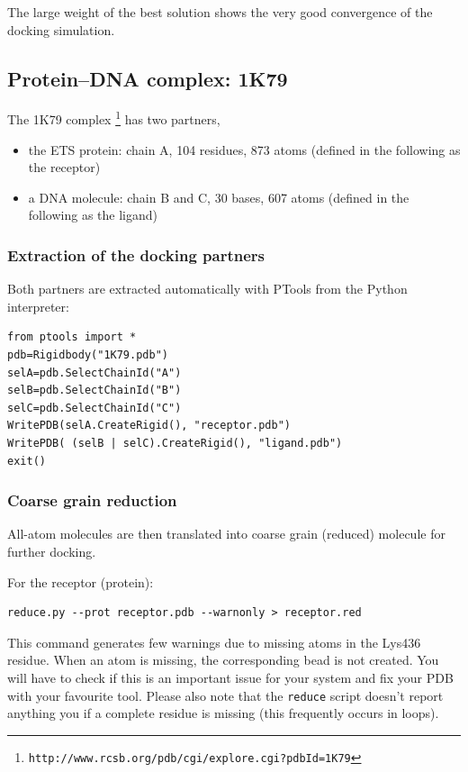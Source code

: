 \documentclass[12pt,a4paper]{article}
\begin{document}
The large weight of the best solution shows the very good convergence of the
docking simulation.

\subsection{Protein--DNA complex: 1K79}


The 1K79 complex \footnote{\tt http://www.rcsb.org/pdb/cgi/explore.cgi?pdbId=1K79} 
has two partners,
\begin{itemize}
\item the ETS protein: chain A, 104 residues, 873 atoms (defined in the following as the receptor)
\item a DNA molecule: chain B and C, 30 bases, 607 atoms (defined in the following as the ligand)
\end{itemize}

\subsubsection{Extraction of the docking partners}

Both partners are extracted automatically with PTools from the Python interpreter:
\begin{verbatim}
from ptools import *
pdb=Rigidbody("1K79.pdb")
selA=pdb.SelectChainId("A")
selB=pdb.SelectChainId("B")
selC=pdb.SelectChainId("C")
WritePDB(selA.CreateRigid(), "receptor.pdb")
WritePDB( (selB | selC).CreateRigid(), "ligand.pdb")
exit()
\end{verbatim}

\subsubsection{Coarse grain reduction}

All-atom molecules are then translated into coarse grain (reduced) molecule for further docking. 

For the receptor (protein): 
\begin{verbatim}
reduce.py --prot receptor.pdb --warnonly > receptor.red
\end{verbatim}

This command generates few warnings due to missing atoms in the Lys436 residue. 
When an atom is missing, the corresponding bead is not created. You will have to check
 if this is an important issue for your system and fix your PDB with your favourite tool.
Please also note that the \verb!reduce! script doesn't report anything you if a complete
 residue is missing (this frequently occurs in loops).
\end{document}
